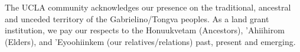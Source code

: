 
\vspace*{\fill}
\begin{center}
    The UCLA community acknowledges our presence on the traditional, ancestral and unceded territory of the Gabrielino/Tongva peoples.
    As a land grant institution, we pay our respects to the Honuukvetam (Ancestors), 'Ahiihirom (Elders), and 'Eyoohiinkem (our relatives/relations) past, present and emerging.
\end{center}
\vspace*{\fill}
